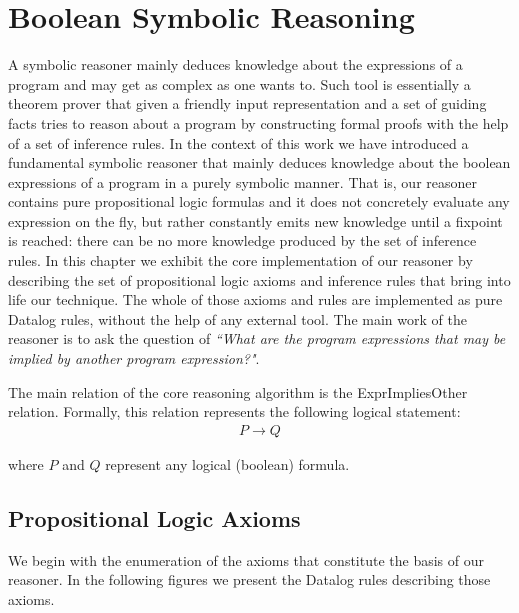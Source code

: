 \section{Boolean Symbolic Reasoning}\label{s:symbolic}

A symbolic reasoner mainly deduces knowledge about the expressions of a program and may get
as complex as one wants to. Such tool is essentially a theorem prover that given a
friendly input representation and a set of guiding facts tries to reason about a program
by constructing formal proofs with the help of a set of inference rules. In the context of this
work we have introduced a fundamental symbolic reasoner that mainly deduces knowledge about the
boolean expressions of a program in a purely symbolic manner. That is, our reasoner
contains pure propositional logic formulas and it
does not concretely evaluate any expression on the fly, but rather constantly emits
new knowledge until a fixpoint is reached: there can be no more knowledge produced by
the set of inference rules. In this chapter we exhibit the core implementation of our
reasoner by describing the set of propositional logic axioms and inference rules that
bring into life our technique. The whole of those axioms and rules are implemented as
pure Datalog rules, without the help of any external tool. The main work of the reasoner
is to ask the question of \emph{``What are the program expressions that may be implied by another program expression?"}.

The main relation of the core reasoning algorithm is the ExprImpliesOther relation. Formally,
this relation represents the following logical statement:\\

\begin{equation}
  \label{eq:implies}
  \begin{aligned}
    P \rightarrow Q
  \end{aligned}
\end{equation}

where $P$ and $Q$ represent any logical (boolean) formula.

\subsection{Propositional Logic Axioms}

We begin with the enumeration of the axioms that constitute the basis of our reasoner.
In the following figures we present the Datalog rules describing those axioms.

